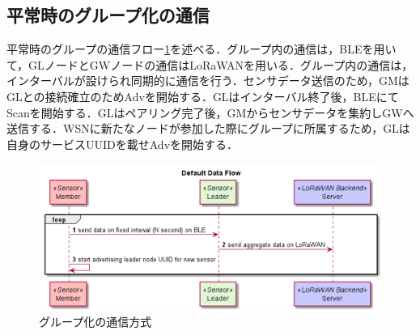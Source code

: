 \subsection{平常時のグループ化の通信}
平常時のグループの通信フロー\ref{fig:default_data_flow}を述べる．グループ内の通信は，BLEを用いて，GLノードとGWノードの通信はLoRaWANを用いる．グループ内の通信は，インターバルが設けられ同期的に通信を行う．センサデータ送信のため，GMはGLとの接続確立のためAdvを開始する．GLはインターバル終了後，BLEにてScanを開始する．GLはペアリング完了後，GMからセンサデータを集約しGWへ送信する．WSNに新たなノードが参加した際にグループに所属するため，GLは自身のサービスUUIDを載せAdvを開始する．

\begin{figure}[]
    \begin{center}
    \includegraphics[width=13cm]{figures/グループ化の通信方式.png}
    \caption{グループ化の通信方式}
    \label{fig:default_data_flow}
    \end{center}
\end{figure}